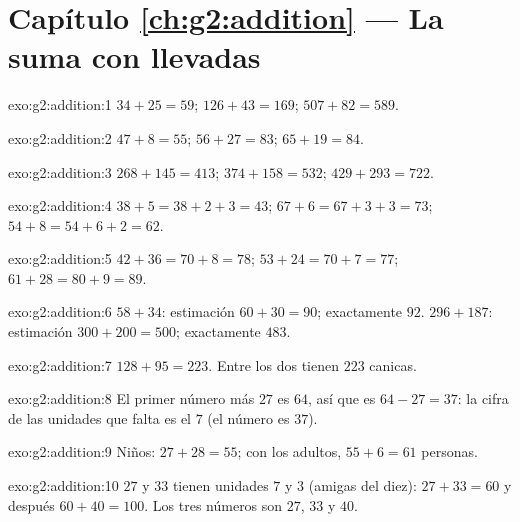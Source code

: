 \section*{Capítulo \ref{ch:g2:addition} --- La suma con llevadas}

\begin{solution}{exo:g2:addition:1}
$34 + 25 = 59$; \quad $126 + 43 = 169$; \quad $507 + 82 = 589$.
\end{solution}

\begin{solution}{exo:g2:addition:2}
$47 + 8 = 55$; \quad $56 + 27 = 83$; \quad $65 + 19 = 84$.
\end{solution}

\begin{solution}{exo:g2:addition:3}
$268 + 145 = 413$; \quad $374 + 158 = 532$; \quad
$429 + 293 = 722$.
\end{solution}

\begin{solution}{exo:g2:addition:4}
$38 + 5 = 38 + 2 + 3 = 43$; \quad $67 + 6 = 67 + 3 + 3 = 73$; \quad
$54 + 8 = 54 + 6 + 2 = 62$.
\end{solution}

\begin{solution}{exo:g2:addition:5}
$42 + 36 = 70 + 8 = 78$; \quad $53 + 24 = 70 + 7 = 77$; \quad
$61 + 28 = 80 + 9 = 89$.
\end{solution}

\begin{solution}{exo:g2:addition:6}
$58 + 34$: estimación $60 + 30 = 90$; exactamente $92$.
$296 + 187$: estimación $300 + 200 = 500$; exactamente $483$.
\end{solution}

\begin{solution}{exo:g2:addition:7}
$128 + 95 = 223$. Entre los dos tienen $223$ canicas.
\end{solution}

\begin{solution}{exo:g2:addition:8}
El primer número más $27$ es $64$, así que es $64 - 27 = 37$: la cifra
de las unidades que falta es el $7$ (el número es $37$).
\end{solution}

\begin{solution}{exo:g2:addition:9}
Niños: $27 + 28 = 55$; con los adultos, $55 + 6 = 61$
personas.
\end{solution}

\begin{solution}{exo:g2:addition:10}
$27$ y $33$ tienen unidades $7$ y $3$ (amigas del diez):
$27 + 33 = 60$ y después $60 + 40 = 100$. Los tres números son
$27$, $33$ y $40$.
\end{solution}

